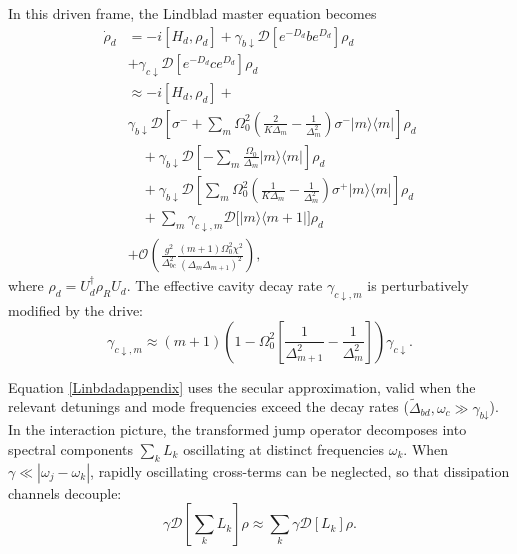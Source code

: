 In this driven frame, the Lindblad master equation becomes
\begin{align}
\label{Linbdadappendix}
    \dot{\rho}_d &= -i[H_d, \rho_d] + \gamma_{b\downarrow} \mathcal{D}\left[ e^{-D_d} b e^{D_d} \right] \rho_d \nonumber \\
    &+ \gamma_{c\downarrow} \mathcal{D}\left[ e^{-D_d} c e^{D_d} \right] \rho_d \nonumber \\
    &\approx-i[H_d, \rho_d] +\nonumber \\
    &\gamma_{b\downarrow} \mathcal{D}\left[ \sigma^- + \sum_m \Omega_0^2 \left(\frac{2}{K\Delta_m} - \frac{1}{\Delta_m^2}\right) \sigma^- |m\rangle\langle m| \right] \rho_d \nonumber \\
    &\quad + \gamma_{b\downarrow} \mathcal{D}\left[ -\sum_m \frac{\Omega_0}{\Delta_m} |m\rangle\langle m| \right] \rho_d \nonumber \\
    &\quad + \gamma_{b\downarrow} \mathcal{D}\left[ \sum_m \Omega_0^2 \left(\frac{1}{K\Delta_m} - \frac{1}{\Delta_m^2}\right) \sigma^+ |m\rangle\langle m| \right] \rho_d \nonumber \\
    &\quad + \sum_m \gamma_{c\downarrow, m} \mathcal{D}\big[ |m\rangle\langle m+1| \big] \rho_d \nonumber  \\
    &+\mathcal{O}\left( \frac{g^2}{\Delta_{bc}^2} \frac{(m+1)\Omega_0^2 \chi^2}{(\Delta_m \Delta_{m+1})^2} \right),
\end{align}
where $\rho_d = U_d^\dagger \rho_R U_d$. The effective cavity decay rate $\gamma_{c\downarrow, m}$ is perturbatively modified by the drive:
\begin{equation}
    \gamma_{c\downarrow, m} \approx (m+1) \left( 1 - \Omega_0^2 \left[ \frac{1}{\Delta_{m+1}^2} - \frac{1}{\Delta_m^2} \right] \right) \gamma_{c\downarrow}.
\end{equation}

Equation \eqref{Linbdadappendix} uses the secular approximation, valid when the relevant detunings and mode frequencies exceed the decay rates ($\widetilde\Delta_\textit{bd}, \omega_c \gg \gamma_{\textit{b}\downarrow}$). In the interaction picture, the transformed jump operator decomposes into spectral components $\sum_k L_k$ oscillating at distinct frequencies $\omega_k$. When $\gamma \ll |\omega_j-\omega_k|$, rapidly oscillating cross-terms can be neglected, so that dissipation channels decouple:
\begin{equation}
\gamma \mathcal{D}\left[ \sum_k L_k \right] \rho \approx \sum_k \gamma \mathcal{D}[L_k] \rho.
\end{equation}

